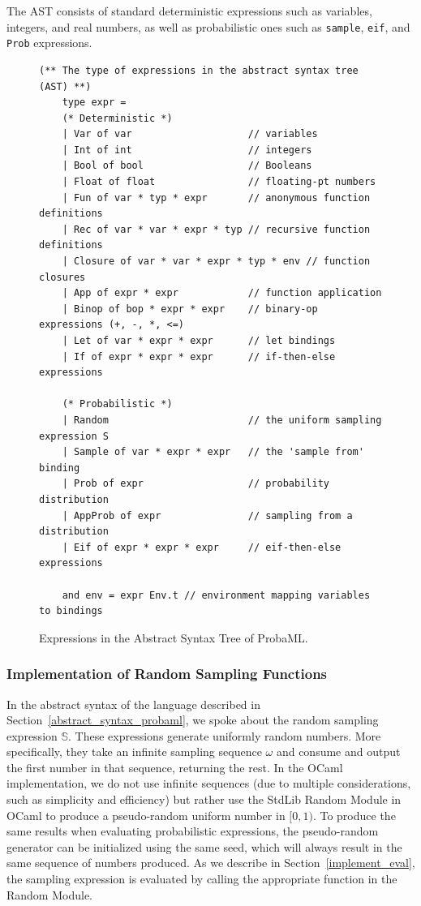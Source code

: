 \documentclass[pageno]{jpaper}
\begin{document}
The AST consists of standard deterministic expressions such as variables, integers, and real numbers, as well as probabilistic ones such as \texttt{sample}, \texttt{eif}, and \texttt{Prob} expressions.
\begin{figure}
  \begin{Verbatim}[frame=single, baselinestretch=1, formatcom=\color{MidnightBlue}]
    (** The type of expressions in the abstract syntax tree (AST) **)
    type expr =
    (* Deterministic *)
    | Var of var                    // variables
    | Int of int                    // integers
    | Bool of bool                  // Booleans
    | Float of float                // floating-pt numbers
    | Fun of var * typ * expr       // anonymous function definitions
    | Rec of var * var * expr * typ // recursive function definitions
    | Closure of var * var * expr * typ * env // function closures
    | App of expr * expr            // function application
    | Binop of bop * expr * expr    // binary-op expressions (+, -, *, <=)
    | Let of var * expr * expr      // let bindings
    | If of expr * expr * expr      // if-then-else expressions

    (* Probabilistic *)
    | Random                        // the uniform sampling expression S
    | Sample of var * expr * expr   // the 'sample from' binding
    | Prob of expr                  // probability distribution
    | AppProb of expr               // sampling from a distribution
    | Eif of expr * expr * expr     // eif-then-else expressions

    and env = expr Env.t // environment mapping variables to bindings
  \end{Verbatim}
  \caption{Expressions in the Abstract Syntax Tree of ProbaML.}
  \label{fig:ast}
\end{figure}

\subsubsection{Implementation of Random Sampling Functions} \label{sampling_function_rand}
In the abstract syntax of the language described in Section~\ref{abstract_syntax_probaml}, we spoke about the random sampling expression $\mathbb{S}$. These expressions generate uniformly random numbers. More specifically, they take an infinite sampling sequence $\omega$ and consume and output the first number in that sequence, returning the rest. In the OCaml implementation, we do not use infinite sequences (due to multiple considerations, such as simplicity and efficiency) but rather use the StdLib Random Module in OCaml \cite{ocaml_random} to produce a pseudo-random uniform number in $[0, 1)$. To produce the same results when evaluating probabilistic expressions, the pseudo-random generator can be initialized using the same seed, which will always result in the same sequence of numbers produced. As we describe in Section~\ref{implement_eval}, the sampling expression is evaluated by calling the appropriate function in the Random Module.
\end{document}
